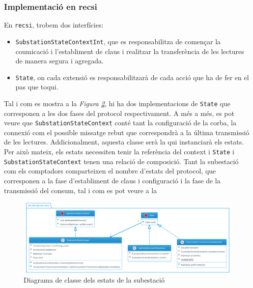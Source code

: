 \subsubsection{Implementació en recsi}
En \texttt{recsi}, trobem dos interfícies:
\begin{itemize}
	\item \texttt{SubstationStateContextInt}, que es responsabilitza de començar la coumicació i l'establiment de claus i realitzar la transferència de les lectures de manera segura i agregada.
	\item \texttt{State}, on cada extensió es responsabilitzarà de cada acció que ha de fer en el pas que toqui.
\end{itemize}
Tal i com es mostra a la \textit{Figura \ref{fig:recsi}}, hi ha dos implementacions de \texttt{State} que corresponen a les dos fases del protocol respectivament. A més a més, es pot veure que \texttt{SubstationStateContext} conté tant la configuració de la corba, la connexió com el possible missatge rebut que correspondrà a la última transmissió de les lectures. Addicionalment, aquesta classe serà la qui instanciarà els estats. Per això mateix, els estats necessiten tenir la referència del context i \texttt{State} i \texttt{SubstationStateContext} tenen una relació de composició. Tant la subestació com els comptadors comparteixen el nombre d'estats del protocol, que corresponen a la fase d'establiment de claus i configuració i la fase de la transmissió del consum, tal i com es pot veure a la
\begin{figure}
	\label{fig:state-recsi}
\end{figure}
\begin{figure}[H]
	\centering
	\includegraphics[width=16cm]{classes/recsi.png}
	\caption{Diagrama de classe dels estats de la subestació}
	\label{fig:recsi}
\end{figure}

